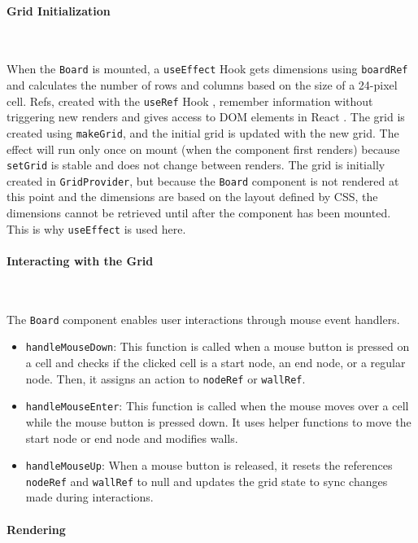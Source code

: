 \paragraph{Grid Initialization} \

When the \texttt{Board} is mounted, a \texttt{useEffect} Hook \cite{react-hooks} gets dimensions using \texttt{boardRef} and calculates the number of rows and columns based on the size of a 24-pixel cell. Refs, created with the \texttt{useRef} Hook \cite{react-hooks}, remember information without triggering new renders and gives access to DOM elements in React \cite{react-hooks}. The grid is created using \texttt{makeGrid}, and the initial grid is updated with the new grid. The effect will run only once on mount (when the component first renders) because \texttt{setGrid} is stable and does not change between renders. The grid is initially created in \texttt{GridProvider}, but because the \texttt{Board} component is not rendered at this point and the dimensions are based on the layout defined by CSS, the dimensions cannot be retrieved until after the component has been mounted. This is why \texttt{useEffect} is used here.

\paragraph{Interacting with the Grid} \

The \texttt{Board} component enables user interactions through mouse event handlers.

\begin{itemize}
    \item \texttt{handleMouseDown}: This function is called when a mouse button is pressed on a cell and checks if the clicked cell is a start node, an end node, or a regular node. Then, it assigns an action to \texttt{nodeRef} or \texttt{wallRef}.
    \item \texttt{handleMouseEnter}: This function is called when the mouse moves over a cell while the mouse button is pressed down. It uses helper functions to move the start node or end node and modifies walls.
    \item \texttt{handleMouseUp}: When a mouse button is released, it resets the references \texttt{nodeRef} and \texttt{wallRef} to null and updates the grid state to sync changes made during interactions.
\end{itemize}

\paragraph{Rendering} \

